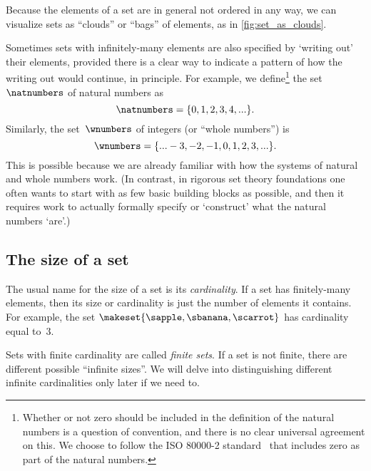 Because the elements of a set are in general not ordered in any way, we can visualize sets as ``clouds'' or ``bags'' of elements, as in \cref{fig:set_as_clouds}.

\begin{remark}
    Sometimes sets with infinitely-many elements are also specified by `writing out' their elements, provided there is a clear way to indicate a pattern of how the writing out would continue, in principle.
    For example, we define\footnote{Whether or not zero should be included in the definition of the natural numbers is a question of convention, and there is no clear universal agreement on this.
        We choose to follow the ISO 80000-2 standard~\cite{ISO:2009:IQU} that includes zero as part of the natural numbers.
    } the set $\natnumbers$ of natural numbers as
    \begin{equation*}
        \natnumbers = \{0, 1, 2, 3, 4, .
        .. \}.
    \end{equation*}
    Similarly, the set~$\wnumbers$ of integers (or ``whole numbers'') is
    \begin{equation*}
        \wnumbers = \{.
        .. -3, -2, -1, 0, 1, 2, 3, ... \}.
    \end{equation*}
    This is possible because we are already familiar with how the systems of natural and whole numbers work.
    (In contrast, in rigorous set theory foundations one often wants to start with as few basic building blocks as possible, and then it requires work to actually formally specify or `construct' what the natural numbers `are'.)
\end{remark}

\subsection{The size of a set}

The usual name for the size of a set is its \emph{cardinality}.
If a set has finitely-many elements, then its size or cardinality is just the number of elements it contains.
For example, the  set
$
    \makeset{ \sapple, \sbanana, \scarrot }
$ has cardinality equal to~$3$.

Sets with finite cardinality are called \emph{finite sets}.
If a set is not finite, there are different possible ``infinite sizes''.
We will delve into distinguishing different infinite cardinalities only later if we need to.

